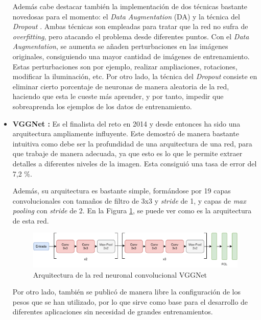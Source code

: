 \begin{itemize}
    Además cabe destacar también la implementación de dos técnicas bastante novedosas para el momento: el \textit{Data Augmentation} (DA) y la técnica del \textit{Dropout} \cite{JMLR:v15:srivastava14a}. Ambas técnicas son empleadas para tratar que la red no sufra de \textit{overfitting}, pero atacando el problema desde diferentes puntos. Con el \textit{Data Augmentation}, se aumenta se añaden perturbaciones en las imágenes originales, consiguiendo una mayor cantidad de imágenes de entrenamiento. Estas perturbaciones son por ejemplo, realizar ampliaciones, rotaciones, modificar la iluminación, etc. Por otro lado, la técnica del \textit{Dropout} consiste en eliminar cierto porcentaje de neuronas de manera aleatoria de la red, haciendo que esta le cueste más aprender, y por tanto, impedir que sobreaprenda los ejemplos de los datos de entrenamiento.
    
    \item \textbf{VGGNet \cite{simonyan2015deep}:} Es el finalista del reto en 2014 y desde entonces ha sido una arquitectura ampliamente influyente. Este demostró de manera bastante intuitiva como debe ser la profundidad de una arquitectura de una red, para que trabaje de manera adecuada, ya que esto es lo que le permite extraer detalles a diferentes niveles de la imagen. Esta consiguió una tasa de error del 7,2 \%.
    
    Además, su arquitectura es bastante simple, formándose por 19 capas convolucionales con tamaños de filtro de 3x3 y \textit{stride} de 1, y capas de \textit{max pooling} con \textit{stride} de 2. En la Figura \ref{fig:vggnet}, se puede ver como es la arquitectura de esta red.\\
    
    \begin{figure}[!h]
        \centering
        \includegraphics[width=1.05\textwidth]{figuras/desarrollo teorico/desarrollo_teorico-VGG16.pdf}
        \caption{Arquitectura de la red neuronal convolucional VGGNet}
        \label{fig:vggnet}
    \end{figure}
    
    Por otro lado, también se publicó de manera libre la configuración de los pesos que se han utilizado, por lo que sirve como base para el desarrollo de diferentes aplicaciones sin necesidad de grandes entrenamientos.
    

\end{itemize}
